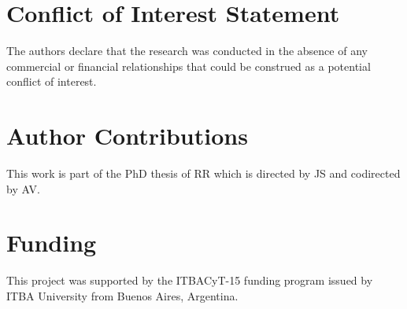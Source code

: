\documentclass[utf8]{frontiersSCNS} %
\begin{document}
\section*{Conflict of Interest Statement}
The authors declare that the research was conducted in the absence of any commercial or financial relationships that could be construed as a potential conflict of interest.

\section*{Author Contributions}

This work is part of the PhD thesis of RR which is directed by JS and codirected by AV.   

\section*{Funding}
This project was supported by the ITBACyT-15 funding program issued by ITBA University from Buenos Aires, Argentina.






\end{document}
